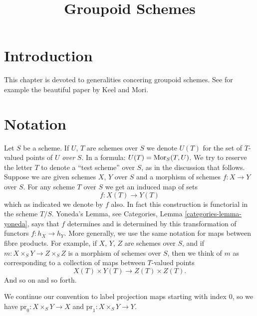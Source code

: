 

%


\title{Groupoid Schemes}


\maketitle

\label{section-phantom}

\tableofcontents

\section{Introduction}
\label{section-introduction}

\noindent
This chapter is devoted to generalities concering groupoid schemes.
See for example the beautiful paper \cite{K-M} by Keel and Mori.





\section{Notation}
\label{section-notation}

\noindent
Let $S$ be a scheme. If $U$, $T$ are schemes over $S$ we denote
$U(T)$ for the set of $T$-valued points of $U$ {\it over} $S$. In a formula:
$U(T) = \mathop{\rm Mor}\nolimits_S(T, U)$. We try to reserve the letter $T$ to denote
a ``test scheme'' over $S$, as in the discussion that follows.
Suppose we are given schemes $X$, $Y$ over
$S$ and a morphism of schemes $f : X \to Y$ over $S$.
For any scheme $T$ over $S$ we get an induced map of sets
$$
f : X(T) \longrightarrow Y(T)
$$
which as indicated we denote by $f$ also. In fact this construction
is functorial in the scheme $T/S$. Yoneda's Lemma, see Categories,
Lemma \ref{categories-lemma-yoneda}, says that $f$ determines and is
determined by this transformation of functors $f : h_X \to h_Y$.
More generally, we use the same notation for maps between fibre
products. For example, if
$X$, $Y$, $Z$ are schemes over $S$, and if
$m : X \times_S Y \to Z \times_S Z$ is
a morphism of schemes over $S$, then we think of $m$ as corresponding
to a collection of maps between $T$-valued points
$$
X(T) \times Y(T) \longrightarrow Z(T) \times Z(T).
$$
And so on and so forth.

\medskip\noindent
We continue our convention to label projection maps starting with
index $0$, so we have $\text{pr}_0 : X \times_S Y \to X$ and
$\text{pr}_1 : X \times_S Y \to Y$.






